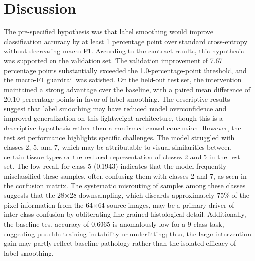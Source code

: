 \documentclass[10pt]{article}
\begin{document}
\section{Discussion}
The pre-specified hypothesis was that label smoothing would improve classification accuracy by at least 1 percentage point over standard cross-entropy without decreasing macro-F1. According to the contract results, this hypothesis was supported on the validation set. The validation improvement of 7.67 percentage points substantially exceeded the 1.0-percentage-point threshold, and the macro-F1 guardrail was satisfied. On the held-out test set, the intervention maintained a strong advantage over the baseline, with a paired mean difference of 20.10 percentage points in favor of label smoothing.
The descriptive results suggest that label smoothing may have reduced model overconfidence and improved generalization on this lightweight architecture, though this is a descriptive hypothesis rather than a confirmed causal conclusion. However, the test set performance highlights specific challenges. The model struggled with classes 2, 5, and 7, which may be attributable to visual similarities between certain tissue types or the reduced representation of classes 2 and 5 in the test set. The low recall for class 5 (0.1943) indicates that the model frequently misclassified these samples, often confusing them with classes 2 and 7, as seen in the confusion matrix. The systematic misrouting of samples among these classes suggests that the 28\ensuremath{\times}28 downsampling, which discards approximately 75\% of the pixel information from the 64\ensuremath{\times}64 source images, may be a primary driver of inter-class confusion by obliterating fine-grained histological detail. Additionally, the baseline test accuracy of 0.6065 is anomalously low for a 9-class task, suggesting possible training instability or underfitting; thus, the large intervention gain may partly reflect baseline pathology rather than the isolated efficacy of label smoothing.
\end{document}
